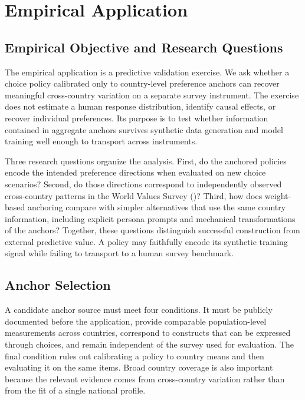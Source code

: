 \section{Empirical Application}

\subsection{Empirical Objective and Research Questions}\label{sec:empirical_objective}
The empirical application is a predictive validation exercise. We ask whether a choice policy calibrated only to country-level preference anchors can recover meaningful cross-country variation on a separate survey instrument. The exercise does not estimate a human response distribution, identify causal effects, or recover individual preferences. Its purpose is to test whether information contained in aggregate anchors survives synthetic data generation and model training well enough to transport across instruments.

Three research questions organize the analysis. First, do the anchored policies encode the intended preference directions when evaluated on new choice scenarios? Second, do those directions correspond to independently observed cross-country patterns in the World Values Survey (\WVS)? Third, how does weight-based anchoring compare with simpler alternatives that use the same country information, including explicit persona prompts and mechanical transformations of the anchors? Together, these questions distinguish successful construction from external predictive value. A policy may faithfully encode its synthetic training signal while failing to transport to a human survey benchmark.

\subsection{Anchor Selection}\label{sec:anchor_selection}
A candidate anchor source must meet four conditions. It must be publicly documented before the application, provide comparable population-level measurements across countries, correspond to constructs that can be expressed through choices, and remain independent of the survey used for evaluation. The final condition rules out calibrating a policy to \WVS{} country means and then evaluating it on the same \WVS{} items. Broad country coverage is also important because the relevant evidence comes from cross-country variation rather than from the fit of a single national profile.

